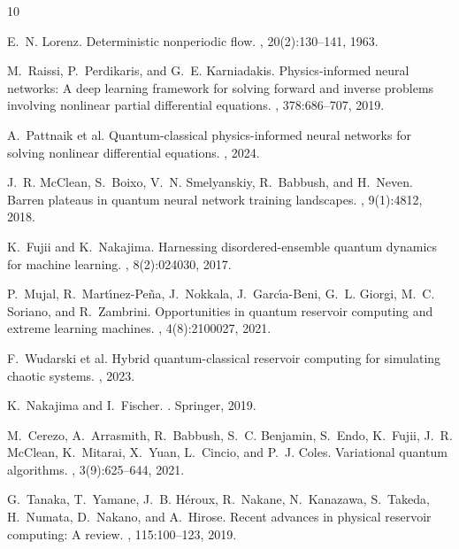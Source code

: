 \documentclass[11pt,a4paper]{article}
\begin{document}

\begin{thebibliography}{10}

E.~N. Lorenz.
\newblock Deterministic nonperiodic flow.
, 20(2):130--141, 1963.

M.~Raissi, P.~Perdikaris, and G.~E. Karniadakis.
\newblock Physics-informed neural networks: A deep learning framework for solving forward and inverse problems involving nonlinear partial differential equations.
, 378:686--707, 2019.

A.~Pattnaik et al.
\newblock Quantum-classical physics-informed neural networks for solving nonlinear differential equations.
, 2024.

J.~R. McClean, S.~Boixo, V.~N. Smelyanskiy, R.~Babbush, and H.~Neven.
\newblock Barren plateaus in quantum neural network training landscapes.
, 9(1):4812, 2018.

K.~Fujii and K.~Nakajima.
\newblock Harnessing disordered-ensemble quantum dynamics for machine learning.
, 8(2):024030, 2017.

P.~Mujal, R.~Mart{\'\i}nez-Pe{\~n}a, J.~Nokkala, J.~Garc{\'\i}a-Beni, G.~L. Giorgi, M.~C. Soriano, and R.~Zambrini.
\newblock Opportunities in quantum reservoir computing and extreme learning machines.
, 4(8):2100027, 2021.

F.~Wudarski et al.
\newblock Hybrid quantum-classical reservoir computing for simulating chaotic systems.
, 2023.

K.~Nakajima and I.~Fischer.
.
\newblock Springer, 2019.

M.~Cerezo, A.~Arrasmith, R.~Babbush, S.~C. Benjamin, S.~Endo, K.~Fujii, J.~R. McClean, K.~Mitarai, X.~Yuan, L.~Cincio, and P.~J. Coles.
\newblock Variational quantum algorithms.
, 3(9):625--644, 2021.

G.~Tanaka, T.~Yamane, J.~B. H{\'e}roux, R.~Nakane, N.~Kanazawa, S.~Takeda, H.~Numata, D.~Nakano, and A.~Hirose.
\newblock Recent advances in physical reservoir computing: A review.
, 115:100--123, 2019.


\end{thebibliography}
\end{document}
